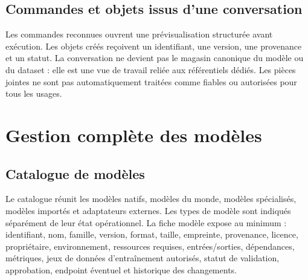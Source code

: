 \documentclass[11pt,a4paper]{article}
\begin{document}
\subsection{Commandes et objets issus d'une conversation}
Les commandes reconnues ouvrent une prévisualisation structurée avant exécution. Les objets créés reçoivent un identifiant, une version, une provenance et un statut. La conversation ne devient pas le magasin canonique du modèle ou du dataset : elle est une vue de travail reliée aux référentiels dédiés. Les pièces jointes ne sont pas automatiquement traitées comme fiables ou autorisées pour tous les usages.

\section{Gestion complète des modèles}
\subsection{Catalogue de modèles}
Le catalogue réunit les modèles natifs, modèles du monde, modèles spécialisés, modèles importés et adaptateurs externes. Les types de modèle sont indiqués séparément de leur état opérationnel. La fiche modèle expose au minimum : identifiant, nom, famille, version, format, taille, empreinte, provenance, licence, propriétaire, environnement, ressources requises, entrées/sorties, dépendances, métriques, jeux de données d'entraînement autorisés, statut de validation, approbation, endpoint éventuel et historique des changements.
\end{document}
